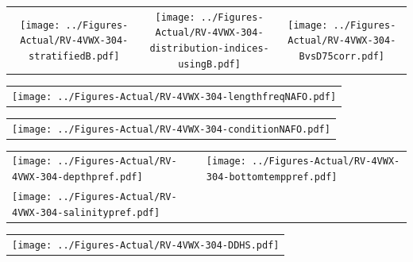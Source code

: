 \documentclass[12pt]{article}\usepackage[]{graphicx}\usepackage[]{color}
\begin{document}
\vspace{1cm}
\begin{minipage}{1.0\textwidth}
 \begin{tabular}{ccc}
\texttt{[image: ../Figures-Actual/RV-4VWX-304-stratifiedB.pdf]} & 
\texttt{[image: ../Figures-Actual/RV-4VWX-304-distribution-indices-usingB.pdf]} & 
\texttt{[image: ../Figures-Actual/RV-4VWX-304-BvsD75corr.pdf]} \\ 
\end{tabular} 
\end{minipage}
\clearpage
\begin{minipage}{1.0\textwidth}
 \begin{tabular}{c}
\texttt{[image: ../Figures-Actual/RV-4VWX-304-lengthfreqNAFO.pdf]} \\ 
\end{tabular} 
\end{minipage}
\newline

\vspace{1cm}
\begin{minipage}{1.0\textwidth}
 \begin{tabular}{c}
\texttt{[image: ../Figures-Actual/RV-4VWX-304-conditionNAFO.pdf]} \\ 
\end{tabular} 
\end{minipage}
\clearpage
\begin{minipage}{1.0\textwidth}
 \begin{tabular}[t]{m{3in}m{3in}}
\texttt{[image: ../Figures-Actual/RV-4VWX-304-depthpref.pdf]} & 
\texttt{[image: ../Figures-Actual/RV-4VWX-304-bottomtemppref.pdf]} \\ 
\texttt{[image: ../Figures-Actual/RV-4VWX-304-salinitypref.pdf]} & 
 \\ 
\end{tabular} 
\end{minipage}
\newline

\vspace{1cm}
\begin{minipage}{1.0\textwidth}
 \begin{tabular}{c}
\texttt{[image: ../Figures-Actual/RV-4VWX-304-DDHS.pdf]} \\ 
\end{tabular} 
\end{minipage}
\clearpage
\end{document}
